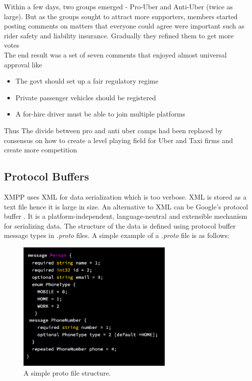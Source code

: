 \documentclass[12pt, conference, a4paper]{article}
\begin{document}
Within a few days, two groups emerged - Pro-Uber and Anti-Uber (twice as large). But as the groups sought to attract more supporters, members started posting comments on matters that everyone could agree were important such as rider safety and liability insurance. Gradually they refined them to get more votes\\
The end result was a set of seven comments that enjoyed almost universal approval  like
\begin{itemize}
  \item The govt should set up a fair regulatory regime
  \item Private passenger vehicles should be registered
  \item A for-hire driver must be able to join multiple platforms
\end{itemize}
Thus The divide between pro and anti uber camps had been replaced by consensus on how to create a level playing field for Uber and Taxi firms and create more competition
\subsection{Protocol Buffers}
XMPP uses XML for data serialization which is too verbose.  XML is stored as a text file hence it is large in size. An alternative to XML can be Google’s protocol buffer \cite{prot-buff}. It is a platform-independent, language-neutral and extensible mechanism for serializing data. The structure of the data is defined using protocol buffer message types in  \textit{.proto} files.  A simple example of a \textit{.proto} file is as follows: 

\begin{figure}[H]
\begin{center}
  \includegraphics[width=3in]{proto_file.png}
  \caption{A simple proto file structure.\cite{prot-buff}}
\end{center}
\end{figure}
\end{document}
